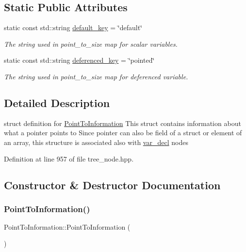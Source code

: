 \subsection*{Static Public Attributes}
\begin{DoxyCompactItemize}
\item 
static const std\+::string \hyperlink{structPointToInformation_a0c45be243f0e7347471cd3accf0bf3b6}{default\+\_\+key} = \char`\"{}default\char`\"{}
\begin{DoxyCompactList}\small\item\em The string used in point\+\_\+to\+\_\+size map for scalar variables. \end{DoxyCompactList}\item 
static const std\+::string \hyperlink{structPointToInformation_a5156ed5d1b7e69205073b3810541d733}{deferenced\+\_\+key} = \char`\"{}pointed\char`\"{}
\begin{DoxyCompactList}\small\item\em The string used in point\+\_\+to\+\_\+size map for deferenced variable. \end{DoxyCompactList}\end{DoxyCompactItemize}


\subsection{Detailed Description}
struct definition for \hyperlink{structPointToInformation}{Point\+To\+Information} This struct contains information about what a pointer points to Since pointer can also be field of a struct or element of an array, this structure is associated also with \hyperlink{structvar__decl}{var\+\_\+decl} nodes 

Definition at line 957 of file tree\+\_\+node.\+hpp.



\subsection{Constructor \& Destructor Documentation}
\mbox{\label{structPointToInformation_a70dd4a9a913e62c85255283d6e523224}} 
\subsubsection{\texorpdfstring{Point\+To\+Information()}{PointToInformation()}}
{\footnotesize\ttfamily Point\+To\+Information\+::\+Point\+To\+Information (\begin{DoxyParamCaption}{ }\end{DoxyParamCaption})\hspace{0.3cm}{\ttfamily [default]}}



